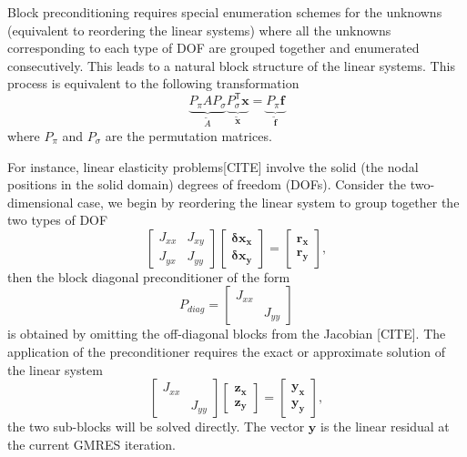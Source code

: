 Block preconditioning requires special enumeration schemes for the unknowns 
(equivalent to reordering the linear systems) where all the unknowns 
corresponding to each type of DOF are grouped together and enumerated 
consecutively. This leads to a natural block structure of the linear systems.
This process is equivalent to the following transformation
\begin{equation*}
  \underbrace{P_{\pi} A P_{\sigma}}_{\tilde{A}} \underbrace{P_{\sigma}^{\mathsf{T}}\mathbf{x}}_{\tilde{\mathbf{x}}}=\underbrace{P_{\pi}\mathbf{f}}_{\tilde{\mathbf{f}}}
\end{equation*}
where $P_{\pi}$ and $P_{\sigma}$ are the permutation matrices.

For instance, linear elasticity problems[CITE] involve the solid (the nodal 
positions in the solid domain) degrees of freedom (DOFs). Consider the 
two-dimensional case, we begin by reordering the linear system to group 
together the two types of DOF 
\begin{equation*}
\begin{bmatrix}
 J_{xx} & J_{xy} \\
 J_{yx} & J_{yy}
\end{bmatrix}
\begin{bmatrix}
 \mathbf{\delta x_x} \\
 \mathbf{\delta x_y} 
\end{bmatrix}
=
\begin{bmatrix}
 \mathbf{r_x} \\
 \mathbf{r_y}
\end{bmatrix},
\end{equation*}
then the block diagonal preconditioner of the form 
\begin{equation*}
P_{diag}=
\begin{bmatrix}
J_{xx}&     \\
      &J_{yy}
\end{bmatrix}
\end{equation*}
is obtained by omitting the off-diagonal blocks from the Jacobian [CITE].
The application of the preconditioner requires the exact or approximate 
solution of the linear system
\begin{equation*}
\begin{bmatrix}
J_{xx}& \\
      &J_{yy}
\end{bmatrix}
\begin{bmatrix}
\mathbf{z_x}\\
\mathbf{z_y}
\end{bmatrix}
=
\begin{bmatrix}
\mathbf{y_x}\\
\mathbf{y_y}
\end{bmatrix},
\end{equation*}
the two sub-blocks will be solved directly. The vector $\mathbf{y}$ is the 
linear residual at the current GMRES iteration.

